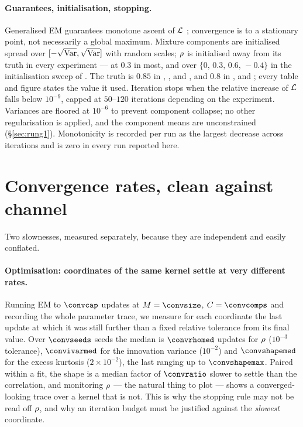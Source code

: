 \paragraph{Guarantees, initialisation, stopping.} Generalised EM guarantees monotone ascent of
$\mathcal{L}$ \citep{dempster1977maximum,wu1983}; convergence is to a stationary point, not necessarily a global
maximum. Mixture components are initialised spread over $[-\sqrt{\operatorname{Var}}, \sqrt{\operatorname{Var}}]$ with random
scales; $\rho$ is initialised away from its truth in every experiment --- at $0.3$ in most, and
over $\{0,\,0.3,\,0.6,\,-0.4\}$ in the initialisation sweep of . The truth is
$0.85$ in , ,  and , and
$0.8$ in ,  and ; every table and figure
states the value it used. Iteration
stops when the relative increase of $\mathcal{L}$ falls below $10^{-9}$, capped at $50$--$120$
iterations depending on the experiment. Variances are floored at $10^{-6}$ to prevent component
collapse; no other regularisation is applied, and the component means are unconstrained
(\S\ref{sec:rung1}). Monotonicity is recorded per run as the largest decrease across iterations and
is zero in every run reported here.

\section{Convergence rates, clean against channel}
\label{app:rates}

Two slownesses, measured separately, because they are independent and easily conflated.

\paragraph{Optimisation: coordinates of the same kernel settle at very different rates.} Running
EM to $\convcap$ updates at $\nseq=\convsize$, $\ncomp=\convcomps$ and recording the whole parameter
trace, we measure for each coordinate the last update at which it was still further than a fixed
relative tolerance from its final value. Over $\convseeds$ seeds the median is $\convrhomed$ updates
for $\rho$ ($10^{-3}$ tolerance), $\convivarmed$ for the innovation variance
($10^{-2}$) and $\convshapemed$ for the excess kurtosis ($2\times10^{-2}$), the
last ranging up to $\convshapemax$. Paired within a fit, the shape is a
median factor of $\convratio$ slower to
settle than the correlation, and monitoring $\rho$ --- the natural thing to plot --- shows a
converged-looking trace over a kernel that is not. This is why the stopping rule may not be read
off $\rho$, and why an iteration budget must be justified against the \emph{slowest} coordinate.

